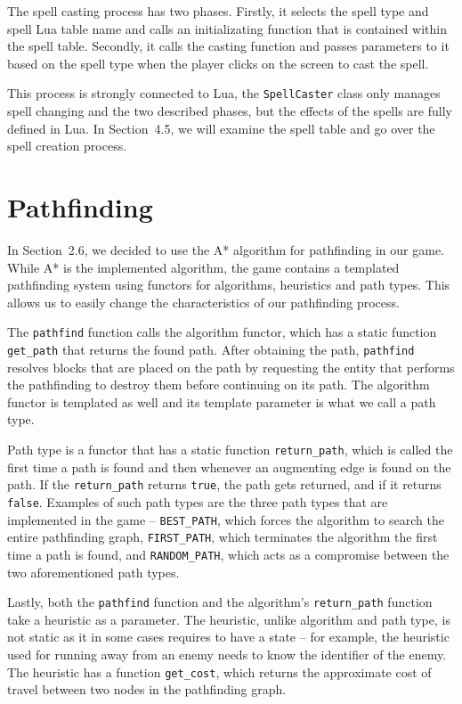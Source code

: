 The spell casting process has two phases. Firstly, it selects the spell type and spell Lua table name and calls an initializating
function that is contained within the spell table. Secondly, it calls the casting function and passes parameters to it based on the spell
type when the player clicks on the screen to cast the spell.

This process is strongly connected to Lua, the \texttt{SpellCaster} class only manages spell changing and the two described phases, but
the effects of the spells are fully defined in Lua. In Section~4.5, we will examine the spell table and go over the spell creation process.

\section{Pathfinding}

In Section~2.6, we decided to use the A* algorithm for pathfinding in our game. While A* is the implemented algorithm, the game contains
a templated pathfinding system using functors for algorithms, heuristics and path types. This allows us to easily change the characteristics
of our pathfinding process. 

The \texttt{pathfind} function calls the algorithm functor, which has a static function \texttt{get\_path} that returns the found path.
After obtaining the path, \texttt{pathfind} resolves blocks that are placed on the path by requesting the entity that performs the
pathfinding to destroy them before continuing on its path. The algorithm functor is templated as well and its template parameter is
what we call a path type.

Path type is a functor that has a static function \texttt{return\_path}, which is called the first time a path is found and then whenever
an augmenting edge is found on the path. If the \texttt{return\_path} returns \texttt{true}, the path gets returned, and if it returns
\texttt{false}. Examples of such path types are the three path types that are implemented in the game -- \texttt{BEST\_PATH}, which forces
the algorithm to search the entire pathfinding graph, \texttt{FIRST\_PATH}, which terminates the algorithm the first time a path is found,
and \texttt{RANDOM\_PATH}, which acts as a compromise between the two aforementioned path types.

Lastly, both the \texttt{pathfind} function and the algorithm's \texttt{return\_path} function take a heuristic as a parameter. The heuristic,
unlike algorithm and path type, is not static as it in some cases requires to have a state -- for example, the heuristic used for running
away from an enemy needs to know the identifier of the enemy. The heuristic has a function \texttt{get\_cost}, which returns the
approximate cost of travel between two nodes in the pathfinding graph.

